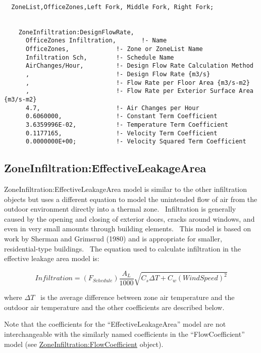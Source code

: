 \begin{lstlisting}

  ZoneList,OfficeZones,Left Fork, Middle Fork, Right Fork;


    ZoneInfiltration:DesignFlowRate,
      OfficeZones Infiltration,       !- Name
      OfficeZones,             !- Zone or ZoneList Name
      Infiltration Sch,        !- Schedule Name
      AirChanges/Hour,         !- Design Flow Rate Calculation Method
      ,                        !- Design Flow Rate {m3/s}
      ,                        !- Flow Rate per Floor Area {m3/s-m2}
      ,                        !- Flow Rate per Exterior Surface Area {m3/s-m2}
      4.7,                     !- Air Changes per Hour
      0.6060000,               !- Constant Term Coefficient
      3.6359996E-02,           !- Temperature Term Coefficient
      0.1177165,               !- Velocity Term Coefficient
      0.0000000E+00;           !- Velocity Squared Term Coefficient
\end{lstlisting}

\subsection{ZoneInfiltration:EffectiveLeakageArea}\label{zoneinfiltrationeffectiveleakagearea}

ZoneInfiltration:EffectiveLeakageArea model is similar to the other infiltration objects but uses a different equation to model the unintended flow of air from the outdoor environment directly into a thermal zone.~ Infiltration is generally caused by the opening and closing of exterior doors, cracks around windows, and even in very small amounts through building elements.~ This model is based on work by Sherman and Grimsrud (1980) and is appropriate for smaller, residential-type buildings.~ The equation used to calculate infiltration in the effective leakage area model is:

\begin{equation}
Infiltration = \left( {{F_{Schedule}}} \right)\frac{{{A_L}}}{{1000}}\sqrt {{C_s}\Delta T + {C_w}{{\left( {WindSpeed} \right)}^2}}
\end{equation}

where \(\Delta T\) ~is the average difference between zone air temperature and the outdoor air temperature and the other coefficients are described below.

Note that the coefficients for the ``EffectiveLeakageArea'' model are not interchangeable with the similarly named coefficients in the ``FlowCoefficient'' model (see \hyperref[zoneinfiltrationflowcoefficient]{ZoneInfiltration:FlowCoefficient} object).


